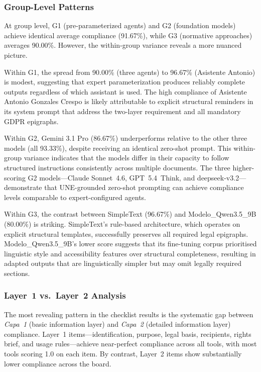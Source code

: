 \documentclass[12pt, a4paper]{article}
\begin{document}
\subsubsection{Group-Level Patterns}
\label{sssec:compliance-groups}

At group level, G1 (pre-parameterized agents) and G2 (foundation models) achieve
identical average compliance (91.67\%), while G3 (normative approaches) averages
90.00\%. However, the within-group variance reveals a more nuanced picture.

Within G1, the spread from 90.00\% (three agents) to 96.67\% (Asistente Antonio) is
modest, suggesting that expert parameterization produces reliably complete outputs
regardless of which assistant is used. The high compliance of Asistente Antonio Gonzales
Crespo is likely attributable to explicit structural reminders in its system prompt that
address the two-layer requirement and all mandatory GDPR epigraphs.

Within G2, Gemini 3.1 Pro (86.67\%) underperforms relative to the other three models
(all 93.33\%), despite receiving an identical zero-shot prompt. This within-group
variance indicates that the models differ in their capacity to follow structured
instructions consistently across multiple documents. The three higher-scoring G2
models---Claude Sonnet~4.6, GPT~5.4~Think, and deepseek-v3.2---demonstrate that
UNE-grounded zero-shot prompting can achieve compliance levels comparable to
expert-configured agents.

Within G3, the contrast between SimpleText (96.67\%) and Modelo\_Qwen3.5\_9B (80.00\%)
is striking. SimpleText's rule-based architecture, which operates on explicit structural
templates, successfully preserves all required legal epigraphs. Modelo\_Qwen3.5\_9B's
lower score suggests that its fine-tuning corpus prioritised linguistic style and
accessibility features over structural completeness, resulting in adapted outputs that
are linguistically simpler but may omit legally required sections.

\subsubsection{Layer~1 vs.\ Layer~2 Analysis}
\label{sssec:layers}

The most revealing pattern in the checklist results is the systematic gap between
\textit{Capa~1} (basic information layer) and \textit{Capa~2} (detailed information
layer) compliance. Layer~1 items---identification, purpose, legal basis, recipients,
rights brief, and usage rules---achieve near-perfect compliance across all tools, with
most tools scoring 1.0 on each item. By contrast, Layer~2 items show substantially lower
compliance across the board.
\end{document}
